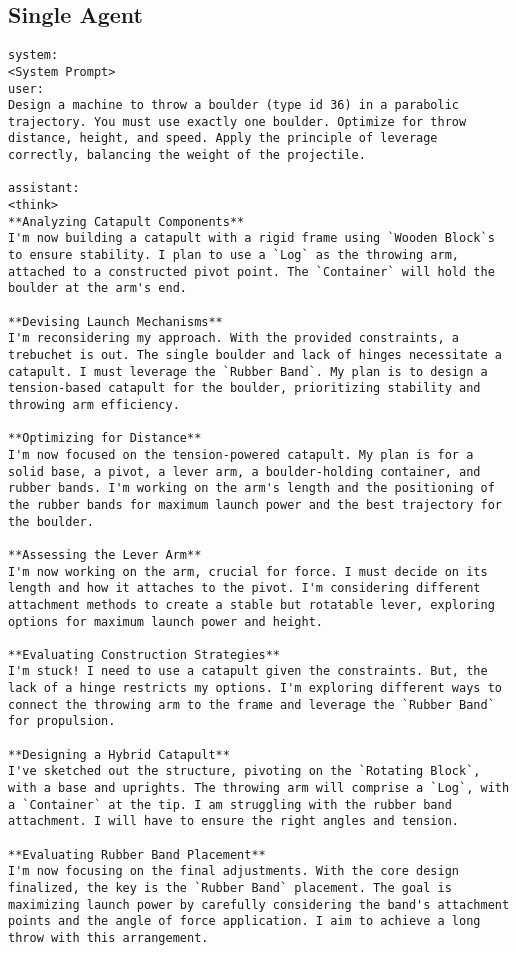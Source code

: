 \subsection{Single Agent}
\begin{lstlisting}
system:
<System Prompt>
user:
Design a machine to throw a boulder (type id 36) in a parabolic trajectory. You must use exactly one boulder. Optimize for throw distance, height, and speed. Apply the principle of leverage correctly, balancing the weight of the projectile.

assistant:
<think>
**Analyzing Catapult Components**
I'm now building a catapult with a rigid frame using `Wooden Block`s to ensure stability. I plan to use a `Log` as the throwing arm, attached to a constructed pivot point. The `Container` will hold the boulder at the arm's end.

**Devising Launch Mechanisms**
I'm reconsidering my approach. With the provided constraints, a trebuchet is out. The single boulder and lack of hinges necessitate a catapult. I must leverage the `Rubber Band`. My plan is to design a tension-based catapult for the boulder, prioritizing stability and throwing arm efficiency.

**Optimizing for Distance**
I'm now focused on the tension-powered catapult. My plan is for a solid base, a pivot, a lever arm, a boulder-holding container, and rubber bands. I'm working on the arm's length and the positioning of the rubber bands for maximum launch power and the best trajectory for the boulder.

**Assessing the Lever Arm**
I'm now working on the arm, crucial for force. I must decide on its length and how it attaches to the pivot. I'm considering different attachment methods to create a stable but rotatable lever, exploring options for maximum launch power and height.

**Evaluating Construction Strategies**
I'm stuck! I need to use a catapult given the constraints. But, the lack of a hinge restricts my options. I'm exploring different ways to connect the throwing arm to the frame and leverage the `Rubber Band` for propulsion.

**Designing a Hybrid Catapult**
I've sketched out the structure, pivoting on the `Rotating Block`, with a base and uprights. The throwing arm will comprise a `Log`, with a `Container` at the tip. I am struggling with the rubber band attachment. I will have to ensure the right angles and tension.

**Evaluating Rubber Band Placement**
I'm now focusing on the final adjustments. With the core design finalized, the key is the `Rubber Band` placement. The goal is maximizing launch power by carefully considering the band's attachment points and the angle of force application. I aim to achieve a long throw with this arrangement.


\end{lstlisting}

